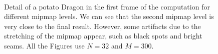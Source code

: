 \begin{figure}[!h]
\vspace{-0.5cm}
\centering
{}
 \\

\caption{Detail of a potato Dragon in the first frame of the computation for different mipmap levels. We can see that the second mipmap level is very close to the final result. However, some artifacts due to the stretching of the mipmap appear, such as black spots and bright seams. All the Figures use $N = 32$ and $M = 300$.}
\label{fig:mipblurring}
\end{figure}
\FloatBarrier

